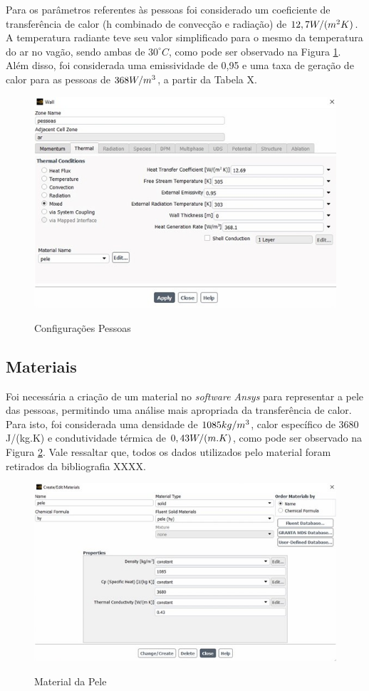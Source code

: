 \documentclass[acronym,symbols,table]{fei}
\begin{document}
Para os parâmetros referentes às pessoas foi considerado um coeficiente de transferência de calor (h combinado de convecção e radiação) de $12,7\space W/(m^2K)$. A temperatura radiante teve seu valor simplificado para o mesmo da temperatura do ar no vagão, sendo ambas de $30 ^\circ C$, como pode ser observado na Figura \ref{fig:Wall}. Além disso, foi considerada uma emissividade de 0,95 e uma taxa de geração de calor para as pessoas de $368\space W/m^3$, a partir da Tabela X. 

\begin{figure}[!htb]
    \centering
    \caption{Configurações Pessoas}
    \includegraphics[width=0.8\linewidth]{Imagens/Wall.jpg}
    \label{fig:Wall}
\end{figure}

\subsection{Materiais}

Foi necessária a criação de um material no \textit{software Ansys} para representar a pele das pessoas, permitindo uma análise mais apropriada da transferência de calor. Para isto, foi considerada uma densidade de $1085\space kg/m^3$, calor específico de 3680 J/(kg.K) e condutividade térmica de $0,43\space W/(m.K)$, como pode ser observado na Figura \ref{fig:Material_Pele}. Vale ressaltar que, todos os dados utilizados pelo material foram retirados da bibliografia XXXX.

\begin{figure}[!htb]
    \centering
    \caption{Material da Pele}
    \includegraphics[width=1\linewidth]{Imagens/Material_Pele.jpg}
    \label{fig:Material_Pele}
\end{figure}
\end{document}
